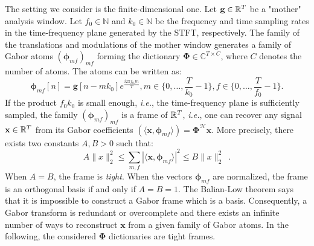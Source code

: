 The setting we consider is the finite-dimensional one. Let $\mathbf{g}\in \mathbb{R}^{T}$ be a "mother" analysis window. Let $f_0\in \mathbb{N}$ and $k_0\in \mathbb{N}$ be the frequency and time sampling rates in the time-frequency plane generated by the STFT, respectively. The family of the translations and modulations of the mother window generates a family of Gabor atoms $(\mathbf{\phi}_{mf})_{mf}$ forming the dictionary $\mathbf{\Phi}\in \mathbb{C}^{T\times C}$, where $C$ denotes the number of atoms. The atoms can be written as:
\begin{equation} \label{eq_gabor_atoms}
	\mathbf{\phi}_{mf}[n] = \mathbf{g}[n-mk_0]e^{\frac{i2\pi f_0 fn}{T}}, m\in \{0,\dots ,\frac{T}{k_0}-1\}, f\in \{0,\dots ,\frac{T}{f_0}-1\}.
\end{equation}
If the product $f_0k_0$ is small enough, \textit{i.e.}, the time-frequency plane is sufficiently sampled, the family $(\mathbf{\phi}_{mf})_{mf}$ is a frame of $\mathbb{R}^T$, \textit{i.e.}, one can recover any signal $\mathbf{x}\in \mathbb{R}^T$ from its Gabor coefficients $(\langle \mathbf{x}, \mathbf{\phi}_{mf}\rangle)=\mathbf{\Phi}^{\mathcal{H}}\mathbf{x}$. More precisely, there exists two constants $A, B > 0$ such that:
\begin{equation} \label{eq_frame}
	A\|x\|_2^2 \leq \sum_{m,f}|\langle \mathbf{x}, \mathbf{\phi}_{mf}\rangle|^2\leq B\|x\|_2^2 \enspace .
\end{equation}
When $A=B$, the frame is \textit{tight}. When the vectors $\mathbf{\phi}_{mf}$ are normalized, the frame is an orthogonal basis if and only if $A=B=1$. The Balian-Low theorem says that it is impossible to construct a Gabor frame which is a basis. Consequently, a Gabor transform is redundant or overcomplete and there exists an infinite number of ways to reconstruct $\mathbf{x}$ from a given family of Gabor atoms. In the following, the considered $\mathbf{\Phi}$ dictionaries are tight frames.

